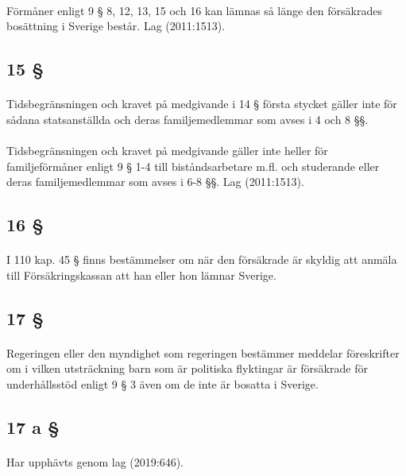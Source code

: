 \documentclass[a4paper,notitlepage,openany,10pt]{book}
\begin{document}
\paragraph*{}
Förmåner enligt 9 § 8, 12, 13, 15 och 16 kan lämnas så länge den försäkrades bosättning i Sverige består.
Lag (2011:1513).
\subsection*{15 §}
\paragraph*{}
Tidsbegränsningen och kravet på medgivande i 14 § första stycket gäller inte för sådana statsanställda och deras familjemedlemmar som avses i 4 och 8 §§.
\paragraph*{}
Tidsbegränsningen och kravet på medgivande gäller inte heller för familjeförmåner enligt 9 § 1-4 till biståndsarbetare m.fl.
och studerande eller deras familjemedlemmar som avses i 6-8 §§.
Lag (2011:1513).
\subsection*{16 §}
\paragraph*{}
I 110 kap. 45 § finns bestämmelser om när den försäkrade är skyldig att anmäla till Försäkringskassan att han eller hon lämnar Sverige.
\subsection*{17 §}
\paragraph*{}
Regeringen eller den myndighet som regeringen bestämmer meddelar föreskrifter om i vilken utsträckning barn som är politiska flyktingar är försäkrade för underhållsstöd enligt 9 § 3 även om de inte är bosatta i Sverige.
\subsection*{17 a §}
\paragraph*{}
Har upphävts genom
lag (2019:646).
\end{document}
